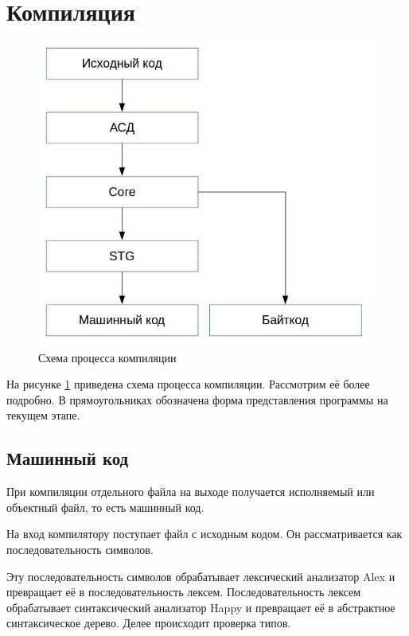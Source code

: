 \documentclass[fontsize=14pt, paper=a4, pagesize, DIV=calc]{scrartcl}
\begin{document}
\section{Компиляция}

\begin{figure}[H]
\centering
\caption{Схема процесса компиляции}
\label{fig:compilation}
\includegraphics[scale=0.8]{compilation.jpg}
\end{figure}

На рисунке \ref{fig:compilation} приведена схема процесса компиляции.
Рассмотрим её более подробно. В прямоугольниках обозначена форма представления
программы на текущем этапе.

\subsection{Машинный код}

При компиляции отдельного файла на выходе получается исполняемый или объектный
файл, то есть машинный код. 

На вход компилятору поступает файл с исходным кодом. Он рассматривается как 
последовательность символов.

Эту последовательность символов обрабатывает лексический анализатор Alex и
превращает её в последовательность лексем. Последовательность лексем
обрабатывает синтаксический анализатор Happy и превращает её в абстрактное
синтаксическое дерево. Делее происходит проверка типов.
\end{document}
